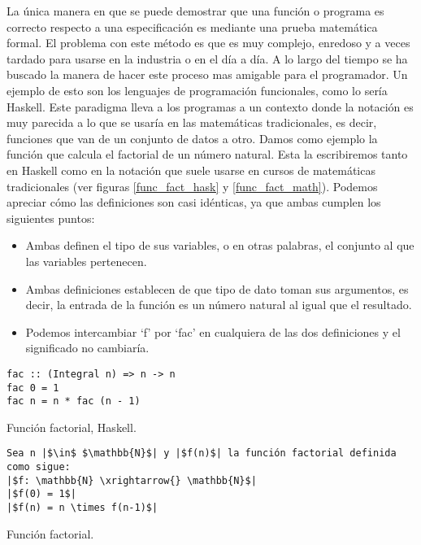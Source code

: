 La única manera en que se puede demostrar que una función o programa es correcto respecto a una 
especificación es mediante una prueba matemática formal. El problema con este método es que es muy 
complejo, enredoso y a veces tardado para usarse en la industria o en el día a día. A lo largo del 
tiempo se ha buscado la manera de hacer este proceso mas amigable para el programador. Un ejemplo de 
esto son los lenguajes de programación funcionales, como lo ser\'ia Haskell. Este paradigma lleva a 
los programas a un contexto donde la notaci\'on es muy parecida a lo que se usar\'ia en las 
matemáticas tradicionales, es decir, funciones que van de un conjunto de datos a otro. Damos como ejemplo la 
funci\'on que calcula el factorial de un n\'umero natural. Esta la escribiremos tanto en Haskell 
como en la notaci\'on que suele usarse en cursos de matemáticas tradicionales (ver figuras 
\ref{func_fact_hask} y \ref{func_fact_math}). 
Podemos apreciar c\'omo las definiciones son casi idénticas, ya que ambas cumplen los siguientes 
puntos:
\begin{itemize}
    \item Ambas definen el tipo de sus variables, o en otras palabras, el conjunto al que las 
    variables pertenecen.
    \item Ambas definiciones establecen de que tipo de dato toman sus argumentos, es decir, la 
    entrada de la funci\'on es un n\'umero natural al igual que el resultado.
    \item Podemos intercambiar `f' por `fac' en cualquiera de las dos definiciones y el significado 
    no cambiaría.
\end{itemize}
\begin{listing}[!ht]
\centering
\captionsetup{justification=centering}
\begin{verbatim}
fac :: (Integral n) => n -> n
fac 0 = 1
fac n = n * fac (n - 1)
\end{verbatim}
\caption{Funci\'on factorial, Haskell.}
\label{func_fact_hask}
\end{listing}

\begin{listing}[!ht]
\centering
\captionsetup{justification=centering}
\begin{verbatim}
Sea n |$\in$ $\mathbb{N}$| y |$f(n)$| la función factorial definida como sigue:
|$f: \mathbb{N} \xrightarrow{} \mathbb{N}$|
|$f(0) = 1$|
|$f(n) = n \times f(n-1)$|
\end{verbatim}
\caption{Funci\'on factorial.}
\label{func_fact_math}
\end{listing}

